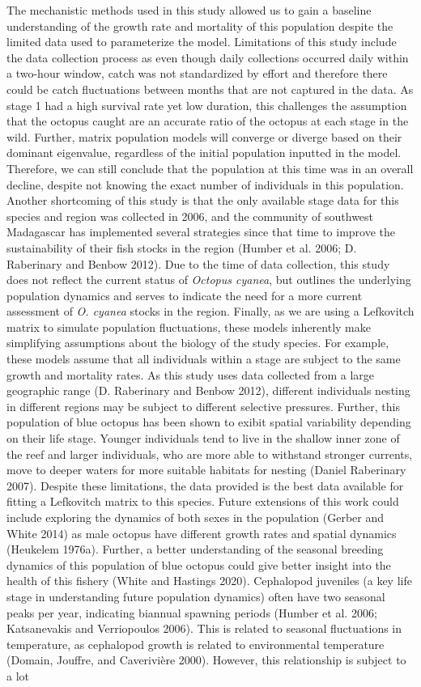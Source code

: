 \documentclass[
]{article}
\begin{document}
The mechanistic methods used in this study allowed us to gain a baseline understanding of the growth rate and mortality of this population despite the limited data used to parameterize the model. Limitations of this study include the data collection process as even though daily collections occurred daily within a two-hour window, catch was not standardized by effort and therefore there could be catch fluctuations between months that are not captured in the data. As stage 1 had a high survival rate yet low duration, this challenges the assumption that the octopus caught are an accurate ratio of the octopus at each stage in the wild. Further, matrix population models will converge or diverge based on their dominant eigenvalue, regardless of the initial population inputted in the model. Therefore, we can still conclude that the population at this time was in an overall decline, despite not knowing the exact number of individuals in this population. Another shortcoming of this study is that the only available stage data for this species and region was collected in 2006, and the community of southwest Madagascar has implemented several strategies since that time to improve the sustainability of their fish stocks in the region (Humber et al. 2006; D. Raberinary and Benbow 2012). Due to the time of data collection, this study does not reflect the current status of \emph{Octopus cyanea}, but outlines the underlying population dynamics and serves to indicate the need for a more current assessment of \emph{O. cyanea} stocks in the region. Finally, as we are using a Lefkovitch matrix to simulate population fluctuations, these models inherently make simplifying assumptions about the biology of the study species. For example, these models assume that all individuals within a stage are subject to the same growth and mortality rates. As this study uses data collected from a large geographic range (D. Raberinary and Benbow 2012), different individuals nesting in different regions may be subject to different selective pressures. Further, this population of blue octopus has been shown to exibit spatial variability depending on their life stage. Younger individuals tend to live in the shallow inner zone of the reef and larger individuals, who are more able to withstand stronger currents, move to deeper waters for more suitable habitats for nesting (Daniel Raberinary 2007). Despite these limitations, the data provided is the best data available for fitting a Lefkovitch matrix to this species. Future extensions of this work could include exploring the dynamics of both sexes in the population (Gerber and White 2014) as male octopus have different growth rates and spatial dynamics (Heukelem 1976a). Further, a better understanding of the seasonal breeding dynamics of this population of blue octopus could give better insight into the health of this fishery (White and Hastings 2020). Cephalopod juveniles (a key life stage in understanding future population dynamics) often have two seasonal peaks per year, indicating biannual spawning periods (Humber et al. 2006; Katsanevakis and Verriopoulos 2006). This is related to seasonal fluctuations in temperature, as cephalopod growth is related to environmental temperature (Domain, Jouffre, and Caverivière 2000). However, this relationship is subject to a lot 
\end{document}
